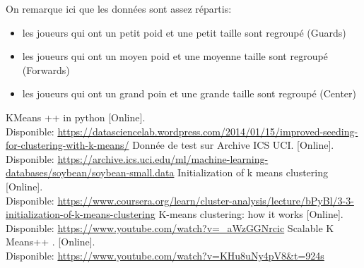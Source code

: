 \documentclass[french]{article}
\begin{document}
On remarque ici que les données sont assez répartis:
\begin{itemize}
\item les joueurs qui ont un petit poid et une petit taille sont regroupé (Guards)
\item les joueurs qui ont un moyen poid et une moyenne taille sont regroupé (Forwards)
\item les joueurs qui ont un grand poin et une grande taille sont regroupé (Center)
\end{itemize} 

\newpage

\begin{thebibliography}{5}
    KMeans ++ in python   [Online]. \\ Disponible:  \url{https://datasciencelab.wordpress.com/2014/01/15/improved-seeding-for-clustering-with-k-means/}
   Donnée de test sur Archive ICS UCI. [Online]. \\ Disponible:  \url{ https://archive.ics.uci.edu/ml/machine-learning-databases/soybean/soybean-small.data}
   Initialization of k means clustering [Online]. \\ Disponible:  \url{https://www.coursera.org/learn/cluster-analysis/lecture/bPyBl/3-3-initialization-of-k-means-clustering}
   K-means clustering: how it works [Online]. \\ Disponible:  \url{ https://www.youtube.com/watch?v=_aWzGGNrcic}
   Scalable K Means++ . [Online]. \\ Disponible:  \url{ https://www.youtube.com/watch?v=KHu8uNy4pV8&t=924s}



\end{thebibliography}
\end{document}
